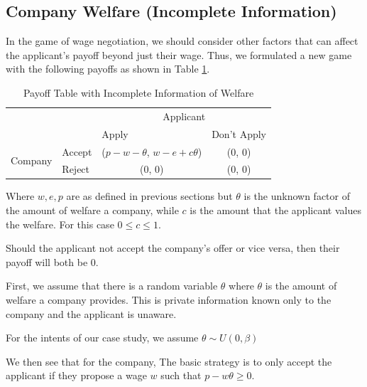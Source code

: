 \documentclass[a4paper, 12pt]{article}
\begin{document}
\subsection{Company Welfare (Incomplete Information)}\label{sec:incomplete}

In the game of wage negotiation, we should consider other factors that can affect the applicant's payoff beyond just their wage. Thus, we formulated a new game with the following payoffs as shown in Table \ref{tab:welfarepayoff}.

\begin{table}[H]
\begin{center}
    \begin{tabular}{clcc}
                                               & \multicolumn{1}{c}{}        & \multicolumn{2}{c}{Applicant}                                 \\ \cline{3-4} 
                                               & \multicolumn{1}{l|}{}       & \multicolumn{1}{l|}{Apply}     & \multicolumn{1}{l|}{Don't Apply} \\ \cline{2-4} 
\multicolumn{1}{c|}{\multirow{2}{*}{Company}} & \multicolumn{1}{l|}{Accept} & \multicolumn{1}{c|}{($p-w -\theta$, $w-e+c\theta$)} & \multicolumn{1}{c|}{($0$, $0$)} \\ \cline{2-4} 
\multicolumn{1}{c|}{}                          & \multicolumn{1}{l|}{Reject} & \multicolumn{1}{c|}{($0$, $0$)}     & \multicolumn{1}{c|}{($0$, $0$)} \\ \cline{2-4} 
\end{tabular}
\end{center}
\caption{Payoff Table with Incomplete Information of Welfare}
\label{tab:welfarepayoff}
\end{table}


Where $w, e, p$ are as defined in previous sections but $\theta$ is the unknown factor of the amount of welfare a company, while $c$ is the amount that the applicant values the welfare. For this case $0 \leq c \leq 1$.

Should the applicant not accept the company's offer or vice versa, then their payoff will both be $0$.

First, we assume that there is a random variable $\theta$ where $\theta$ is the amount of welfare a company provides. This is private information known only to the company and the applicant is unaware.

For the intents of our case study, we assume $\theta \sim U(0, \beta)$

We then see that for the company, The basic strategy is to only accept the applicant if they propose a wage $w$ such that $p - w \theta \geq 0$.
\end{document}
